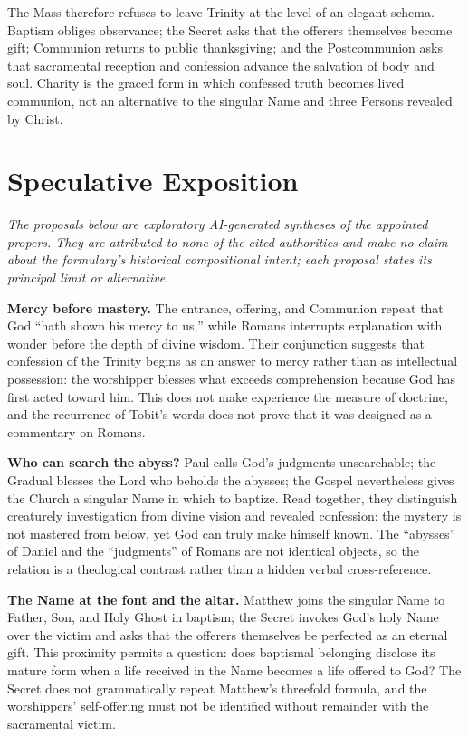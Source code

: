 \begin{deepstudy}
The Mass therefore refuses to leave Trinity at the level of an elegant schema. Baptism obliges observance; the Secret asks that the offerers themselves become gift; Communion returns to public thanksgiving; and the Postcommunion asks that sacramental reception and confession advance the salvation of body and soul. Charity is the graced form in which confessed truth becomes lived communion, not an alternative to the singular Name and three Persons revealed by Christ.

\newpage
\section*{Speculative Exposition}

\noindent\emph{The proposals below are exploratory AI-generated syntheses of the appointed propers. They are attributed to none of the cited authorities and make no claim about the formulary's historical compositional intent; each proposal states its principal limit or alternative.}

\noindent\textbf{Mercy before mastery.\enspace{}}
The entrance, offering, and Communion repeat that God ``hath shown his mercy to us,'' while Romans interrupts explanation with wonder before the depth of divine wisdom. Their conjunction suggests that confession of the Trinity begins as an answer to mercy rather than as intellectual possession: the worshipper blesses what exceeds comprehension because God has first acted toward him. This does not make experience the measure of doctrine, and the recurrence of Tobit's words does not prove that it was designed as a commentary on Romans.

\noindent\textbf{Who can search the abyss?\enspace{}}
Paul calls God's judgments unsearchable; the Gradual blesses the Lord who beholds the abysses; the Gospel nevertheless gives the Church a singular Name in which to baptize. Read together, they distinguish creaturely investigation from divine vision and revealed confession: the mystery is not mastered from below, yet God can truly make himself known. The ``abysses'' of Daniel and the ``judgments'' of Romans are not identical objects, so the relation is a theological contrast rather than a hidden verbal cross-reference.

\noindent\textbf{The Name at the font and the altar.\enspace{}}
Matthew joins the singular Name to Father, Son, and Holy Ghost in baptism; the Secret invokes God's holy Name over the victim and asks that the offerers themselves be perfected as an eternal gift. This proximity permits a question: does baptismal belonging disclose its mature form when a life received in the Name becomes a life offered to God? The Secret does not grammatically repeat Matthew's threefold formula, and the worshippers' self-offering must not be identified without remainder with the sacramental victim.


\end{deepstudy}

